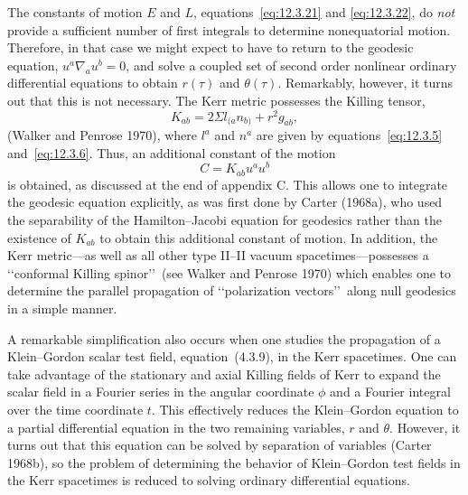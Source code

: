 The constants of motion \(E\) and \(L\), equations~\eqref{eq:12.3.21} and
\eqref{eq:12.3.22}, do \emph{not} provide a sufficient number of first integrals to
determine nonequatorial motion. Therefore, in that case we might expect to have to
return to the geodesic equation, \(u^a\nabla_au^b=0\), and solve a coupled set of
second order nonlinear ordinary differential equations to obtain \(r(\tau)\) and
\(\theta(\tau)\). Remarkably, however, it turns out that this is not necessary. The
Kerr metric possesses the Killing tensor,
\begin{equation}
 K_{ab}=2\Sigma l_{(a}n_{b)}+r^2g_{ab},
 \tag{12.3.26}\label{eq:12.3.26}
\end{equation}
(Walker and Penrose 1970), where \(l^a\) and \(n^a\) are given by
equations~\eqref{eq:12.3.5} and~\eqref{eq:12.3.6}. Thus, an additional constant of
the motion
\begin{equation}
 C=K_{ab}u^au^b
 \tag{12.3.27}\label{eq:12.3.27}
\end{equation}
is obtained, as discussed at the end of appendix C. This allows one to integrate the
geodesic equation explicitly, as was first done by Carter (1968a), who used the
separability of the Hamilton--Jacobi equation for geodesics rather than the existence
of \(K_{ab}\) to obtain this additional constant of motion. In addition, the Kerr
metric---as well as all other type II--II vacuum spacetimes---possesses a
\lq\lq conformal Killing spinor\rq\rq\ (see Walker and Penrose 1970) which enables
one to determine the parallel propagation of \lq\lq polarization vectors\rq\rq\ along
null geodesics in a simple manner.

A remarkable simplification also occurs when one studies the propagation of a
Klein--Gordon scalar test field, equation~(4.3.9), in the Kerr spacetimes. One can
take advantage of the stationary and axial Killing fields of Kerr to expand the scalar
field in a Fourier series in the angular coordinate \(\phi\) and a Fourier integral over
the time coordinate \(t\). This effectively reduces the Klein--Gordon equation to a
partial differential equation in the two remaining variables, \(r\) and \(\theta\).
However, it turns out that this equation can be solved by separation of variables
(Carter 1968b), so the problem of determining the behavior of Klein--Gordon test
fields in the Kerr spacetimes is reduced to solving ordinary differential equations.

